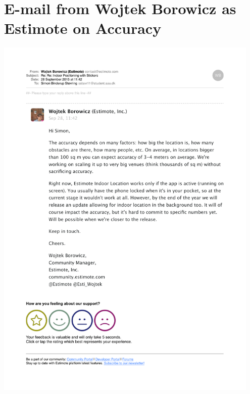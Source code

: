 \chapter{E-mail from Wojtek Borowicz as Estimote on Accuracy}
\label{appendix:estimote-accuracy}
\centering
\includegraphics[width=0.95\textwidth]{images/estimote-accuracy-estimate-mail}